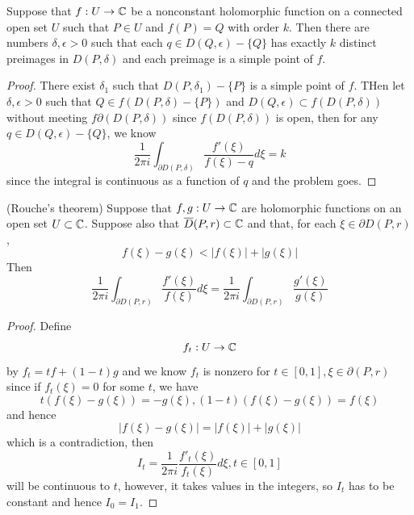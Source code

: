 \begin{theorem}
    Suppose that $f:U\to\mathbb{C}$ be a nonconstant holomorphic function on a connected open set $U$ such that $P\in U$ and $f(P) = Q$ with order $k$. Then there are numbers $\delta,\epsilon > 0$ such that each $q\in D(Q,\epsilon)-\{Q\}$ has exactly $k$ distinct preimages in $D(P,\delta)$ and each preimage is a simple point of $f$.
\end{theorem}
\begin{proof}
    There exist $\delta_1$ such that $D(P,\delta_1)-\{P\}$ is a simple point of $f$. THen let $\delta,\epsilon > 0$ such that $Q\in f(D(P,\delta)-\{P\})$ and $D(Q,\epsilon) \subset f(D(P,\delta))$ without meeting $f\partial(D(P,\delta))$ since $f(D(P,\delta))$ is open, then for any $q\in D(Q,\epsilon)-\{Q\}$, we know
    \[\dfrac{1}{2\pi i}\int_{\partial D(P,\delta)} \dfrac{f'(\xi)}{f(\xi)-q}d\xi = k\]
    since the integral is continuous as a function of $q$ and the problem goes.
\end{proof}

\begin{theorem}
    (Rouche's theorem) Suppose that $f,g:U\to\mathbb{C}$ are holomorphic functions on an open set $U\subset\mathbb{C}$. Suppose also that $\overline{D}(P,r)\subset\mathbb{C}$ and that, for each $\xi\in\partial D(P,r)$,
    \[f(\xi)-g(\xi) < |f(\xi)|+|g(\xi)|\]
    Then
    \[
    \dfrac{1}{2\pi i}\int_{\partial D(P,r)} \dfrac{f'(\xi)}{f(\xi)} d\xi = \dfrac{1}{2\pi i}\int_{\partial D(P,r)} \dfrac{g'(\xi)}{g(\xi)}
    \]
\end{theorem}
\begin{proof}
    Define
    \[
    f_t:U\to\mathbb{C}
    \]
    by $f_t = tf+(1-t)g$ and we know $f_t$ is nonzero for $t\in[0,1], \xi \in \partial (P,r)$ since if $f_t(\xi) =  0$ for some $t$, we have
    \[t(f(\xi)-g(\xi)) = -g(\xi),(1-t)(f(\xi)-g(\xi)) = f(\xi)\]
    and hence
    \[|f(\xi)-g(\xi)| = |f(\xi)|+|g(\xi)|\]
    which is a contradiction, then
    \[I_t  =\dfrac{1}{2\pi i}\dfrac{f'_t(\xi)}{f_t(\xi)}d\xi, t\in [0,1]\]
    will be continuous to $t$, however, it takes values in the integers, so $I_t$ has to be constant and hence $I_0 = I_1$.
\end{proof}

